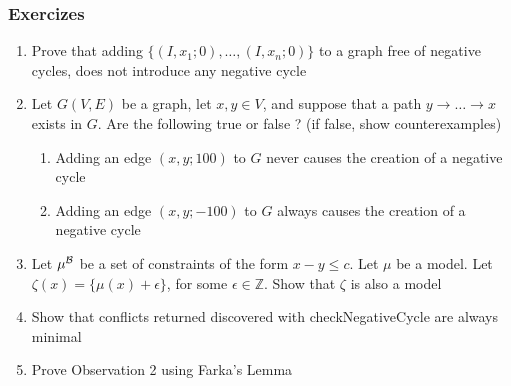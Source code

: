 \begin{frame}
  \frametitle{Exercizes}

  \begin{enumerate}

    \item Prove that adding $\{ (I,x_1;0), \ldots, (I,x_n;0) \}$ to a graph
          free of negative cycles, does not introduce any negative cycle

    \vfill

    \item Let $G(V,E)$ be a graph, let $x,y \in V$, and suppose that
          a path $y \rightarrow \ldots \rightarrow x$ exists in $G$.
	  Are the following true or false ? (if false, show counterexamples)

    \vfill

    \begin{enumerate}[$(a)$]

      \item Adding an edge $(x,y;100)$ to $G$ never causes the creation of a negative cycle 

      \item Adding an edge $(x,y;-100)$ to $G$ always causes the creation of a negative cycle 

    \end{enumerate}

    \vfill

    \item Let $\mu^{\mathcal{B}}$ be a set of constraints of the form $x - y \leq c$. Let
          $\mu$ be a model. Let $\zeta(x) = \{ \mu(x) + \epsilon \}$, 
	  for some $\epsilon \in \mathbb{Z}$. Show that $\zeta$  is also a model

    \vfill

    \item Show that conflicts returned discovered with checkNegativeCycle
          are always minimal

    \vfill

    \item Prove Observation 2 using Farka's Lemma

  \end{enumerate}

\end{frame}
